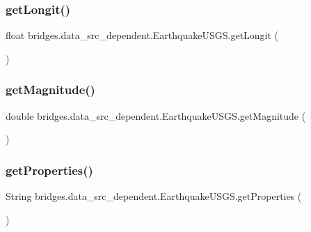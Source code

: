 \subsubsection{\texorpdfstring{get\+Longit()}{getLongit()}}
{\footnotesize\ttfamily float bridges.\+data\+\_\+src\+\_\+dependent.\+Earthquake\+U\+S\+G\+S.\+get\+Longit (\begin{DoxyParamCaption}{ }\end{DoxyParamCaption})}

\hypertarget{classbridges_1_1data__src__dependent_1_1_earthquake_u_s_g_s_a3ec5d753277d6287b222448ff2477291}{}\label{classbridges_1_1data__src__dependent_1_1_earthquake_u_s_g_s_a3ec5d753277d6287b222448ff2477291} 
\subsubsection{\texorpdfstring{get\+Magnitude()}{getMagnitude()}}
{\footnotesize\ttfamily double bridges.\+data\+\_\+src\+\_\+dependent.\+Earthquake\+U\+S\+G\+S.\+get\+Magnitude (\begin{DoxyParamCaption}{ }\end{DoxyParamCaption})}

\hypertarget{classbridges_1_1data__src__dependent_1_1_earthquake_u_s_g_s_a6676a3f0a11accf6a510648601e05310}{}\label{classbridges_1_1data__src__dependent_1_1_earthquake_u_s_g_s_a6676a3f0a11accf6a510648601e05310} 
\subsubsection{\texorpdfstring{get\+Properties()}{getProperties()}}
{\footnotesize\ttfamily String bridges.\+data\+\_\+src\+\_\+dependent.\+Earthquake\+U\+S\+G\+S.\+get\+Properties (\begin{DoxyParamCaption}{ }\end{DoxyParamCaption})}

